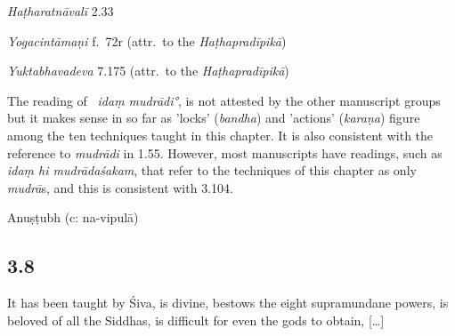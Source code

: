 \begin{ekdosis}
\begin{testimonia}[hp03_007]
\emph{Haṭharatnāvalī} 2.33
\begin{versinnote}
\end{versinnote}

\emph{Yogacintāmaṇi} f.~72r (attr.~to the \emph{Haṭhapradīpikā})
\begin{versinnote}
\end{versinnote}

\emph{Yuktabhavadeva} 7.175 (attr.~to the \emph{Haṭhapradīpikā})
\begin{versinnote}
\end{versinnote}

\end{testimonia}

The reading of \textalpha\, \emph{idaṃ mudrādi°}, is not attested by the other manuscript groups but it makes sense in so far as 'locks' (\emph{bandha}) and 'actions' (\emph{karaṇa}) figure among the ten techniques taught in this chapter. It is also consistent with the reference to \emph{mudrādi} in 1.55. However, most manuscripts have readings, such as \emph{idaṃ hi mudrādaśakam}, that refer to the techniques of this chapter as only \emph{mudrā}s, and this is consistent with 3.104.


\begin{metre}[hp03_007]
Anuṣṭubh (c: na-vipulā)
\end{metre}

\subsection*{3.8}
\begin{translation}[hp03_008]
It has been taught by Śiva, is divine, bestows the eight supramundane powers, is beloved of all the Siddhas, is difficult for even the gods to obtain, [\dots] 
\end{translation}


\end{ekdosis}
